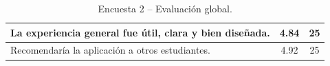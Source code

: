 \begin{table}[H]
\centering
\footnotesize
\setlength{\tabcolsep}{4pt}
\renewcommand{\arraystretch}{1.35}
\begin{tabular}{|p{10.5cm}|c|c|}
\hline
La experiencia general fue útil, clara y bien diseñada. & 4.84 & 25 \\
\hline
Recomendaría la aplicación a otros estudiantes. & 4.92 & 25 \\
\hline
\end{tabular}
\caption{Encuesta 2 – Evaluación global.}
\label{tab:anexo-ea-global}
\end{table}
